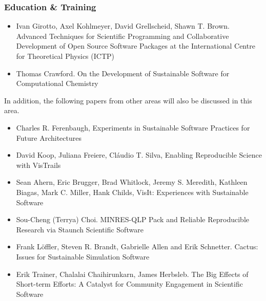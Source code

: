 \documentclass[11pt, oneside]{amsart}
\begin{document}
\subsubsection{Education \& Training}

\begin{itemize}

\item Ivan Girotto, Axel Kohlmeyer, David Grellscheid, Shawn T. Brown. Advanced Techniques for Scientific Programming and Collaborative Development of Open Source Software Packages at the International Centre for Theoretical Physics (ICTP) \cite{Girotto_WSSSPE}

\item Thomas Crawford. On the Development of Sustainable Software for Computational Chemistry \cite{Crawford_WSSSPE}

\end{itemize}

In addition, the following papers from other areas will also be discussed in this area.

\begin{itemize}

\item Charles R. Ferenbaugh, Experiments in Sustainable Software Practices for Future Architectures \cite{Ferenbaugh_WSSSPE}

\item David Koop, Juliana Freiere, Cl\'{a}udio T. Silva, Enabling Reproducible Science with VisTrails~\cite{Koop_WSSSPE}

\item Sean Ahern, Eric Brugger, Brad Whitlock, Jeremy S. Meredith, Kathleen Biagas, Mark C. Miller, Hank Childs, VisIt: Experiences with Sustainable Software \cite{Ahern_WSSSPE}

\item Sou-Cheng (Terrya) Choi. MINRES-QLP Pack and Reliable Reproducible Research via Staunch Scientific Software \cite{Choi_WSSSPE}

\item Frank L\"{o}ffler, Steven R. Brandt, Gabrielle Allen and Erik Schnetter. Cactus: Issues for Sustainable Simulation Software \cite{Loffler_WSSSPE}

\item Erik Trainer, Chalalai Chaihirunkarn, James Herbsleb. The Big Effects of Short-term Efforts: A Catalyst for Community Engagement in Scientific Software \cite{Trainer_WSSSPE}

\end{itemize}
\end{document}
